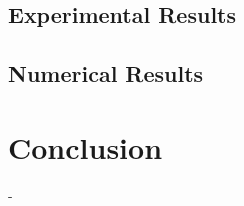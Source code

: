 \documentclass{IEEEtran}
\begin{document}
    \subsection{Experimental Results}
    

    \subsection{Numerical Results}

	
	\section{Conclusion}

 -
	
	\newpage
    \printbibliography
	
\end{document}

